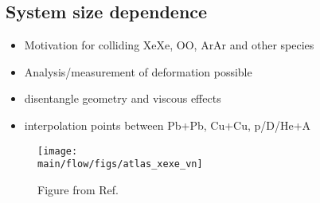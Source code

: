 \subsection{System size dependence}

\begin{itemize}
\item Motivation for colliding XeXe,  OO,  ArAr and other species
\item Analysis/measurement of deformation possible
\item disentangle geometry and viscous effects
\item interpolation points between Pb+Pb,  Cu+Cu,  p/D/He+A
\end{itemize}


\begin{figure}[!htb]
\begin{center}
\texttt{[image: \\main/flow/figs/atlas\_xexe\_vn]}
\caption{
	Figure from Ref.~\cite{ATLAS-CONF-2018-011}
}
\label{fig:atlas_xexe_vn}
\end{center}
\end{figure}
